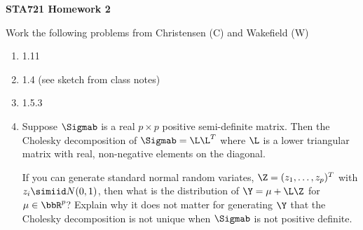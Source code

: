 \documentclass[12pt]{article}
\begin{document}
{\bf STA721 \hfill Homework 2}

\vspace{.5in}
\noindent
Work the following problems from Christensen (C) and Wakefield (W)
\begin{enumerate}
\item 1.11
\item 1.4  (see sketch from class notes)
\item 1.5.3
\item Suppose $\Sigmab$ is a real $p \times p$ positive semi-definite
  matrix.  Then the Cholesky decomposition of 
  $\Sigmab = \L \L^T$ where $\L$ is a lower triangular matrix with
  real, non-negative elements on the diagonal.

  If you can generate standard normal random variates, $\Z = (z_1,
  \ldots, z_p)^T$ with $z_i \simiid N(0,1)$, then what is the
  distribution of $\Y = \mu + \L \Z$ for $\mu \in \bbR^p$?   Explain why it
  does not matter for generating $\Y$ that the Cholesky decomposition is
  not unique when $\Sigmab$ is not positive definite.

\end{enumerate}
\end{document}
